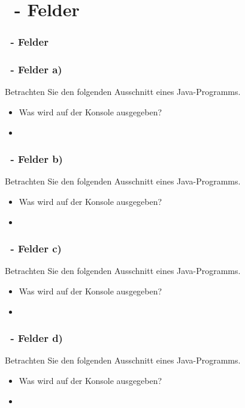 \def\stitle{\theexercise\ - Felder}
\section{\stitle}
\begin{frame}
  \frametitle{\stitle}%
\tableofcontents[current]
\end{frame}



\begin{frame}[t]%
    \frametitle{\stitle \: a)}

  Betrachten Sie den folgenden Ausschnitt eines Java-Programms.
  
  \begin{itemize}
  \item Was wird auf der Konsole ausgegeben?
  \pause
  \item \code{[1, 3, 6, 10, 15]}
  \end{itemize}
\end{frame}


\begin{frame}[t]%
    \frametitle{\stitle \: b)}

  Betrachten Sie den folgenden Ausschnitt eines Java-Programms.
  
  \begin{itemize}
  \item Was wird auf der Konsole ausgegeben?
  \pause
  \item \code{[1, 3, 5, 7, 9]}
  \end{itemize}
\end{frame}

\begin{frame}[t]%
    \frametitle{\stitle \: c)}

  Betrachten Sie den folgenden Ausschnitt eines Java-Programms.
  
  \begin{itemize}
  \item Was wird auf der Konsole ausgegeben?
  \pause
  \item \code{[1, 2, 3, 2, 1]}
  \end{itemize}
\end{frame}


\begin{frame}[t]%
    \frametitle{\stitle \: d)}

  Betrachten Sie den folgenden Ausschnitt eines Java-Programms.
  
  \begin{itemize}
  \item Was wird auf der Konsole ausgegeben?
  \pause
  \item \code{[0, 0, 3, 3, 3]}
  \end{itemize}
\end{frame}

